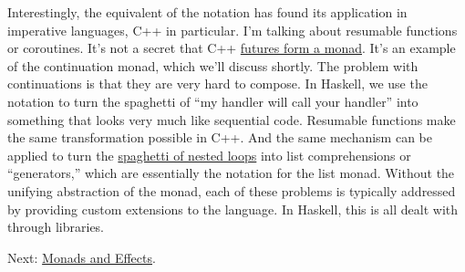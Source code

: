 Interestingly, the equivalent of the  notation has found its
application in imperative languages, C++ in particular. I'm talking
about resumable functions or coroutines. It's not a secret that C++
\href{https://bartoszmilewski.com/2014/02/26/c17-i-see-a-monad-in-your-future/}{futures
form a monad}. It's an example of the continuation monad, which we'll
discuss shortly. The problem with continuations is that they are very
hard to compose. In Haskell, we use the  notation to turn the
spaghetti of ``my handler will call your handler'' into something that
looks very much like sequential code. Resumable functions make the same
transformation possible in C++. And the same mechanism can be applied to
turn the
\href{https://bartoszmilewski.com/2014/04/21/getting-lazy-with-c/}{spaghetti
of nested loops} into list comprehensions or ``generators,'' which are
essentially the  notation for the list monad. Without the
unifying abstraction of the monad, each of these problems is typically
addressed by providing custom extensions to the language. In Haskell,
this is all dealt with through libraries.

Next:
\href{https://bartoszmilewski.com/2016/11/30/monads-and-effects/}{Monads
and Effects}.
